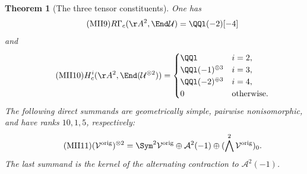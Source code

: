 \documentclass[11pt,a4paper]{article}
\newtheorem{theorem}{Theorem}[section]
\begin{document}
\begin{theorem}[The three tensor constituents]\label{mii:mii:tensor}
One has
\begin{equation}\tag{MII9}\label{mii:mii:endU}
 R\Gamma_c(\AA^2,\End\mathcal U)=\QQl(-2)[-4]
\end{equation}
and
\begin{equation}\tag{MII10}\label{mii:mii:endtensor}
 H_c^i(\AA^2,\End(\mathcal U^{\otimes2}))=
 \begin{cases}
 \QQl&i=2,\\
 \QQl(-1)^{\oplus3}&i=3,\\
 \QQl(-2)^{\oplus3}&i=4,\\
 0&\text{otherwise}.
 \end{cases}
\end{equation}
The following direct summands are geometrically simple, pairwise
nonisomorphic, and have ranks $10,1,5$, respectively:
\begin{equation}\tag{MII11}\label{mii:mii:decomposition}
 (\mathcal V^{\rm orig})^{\otimes2}
 =\Sym^2\mathcal V^{\rm orig}
 \oplus\mathcal A^2(-1)
 \oplus(\bigwedge^2\mathcal V^{\rm orig})_0.
\end{equation}
The last summand is the kernel of the alternating contraction to
$\mathcal A^2(-1)$.
\end{theorem}
\end{document}
